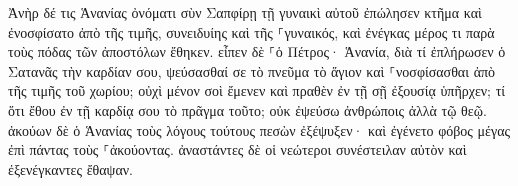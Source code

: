 \documentclass{openreader}
\begin{document}
Ἀνὴρ δέ τις Ἁνανίας ὀνόματι σὺν Σαπφίρῃ τῇ γυναικὶ αὐτοῦ ἐπώλησεν κτῆμα 
καὶ ἐνοσφίσατο ἀπὸ τῆς τιμῆς, συνειδυίης καὶ τῆς ⸀γυναικός, καὶ ἐνέγκας μέρος τι παρὰ τοὺς πόδας τῶν ἀποστόλων ἔθηκεν. 
εἶπεν δὲ ⸀ὁ Πέτρος· Ἁνανία, διὰ τί ἐπλήρωσεν ὁ Σατανᾶς τὴν καρδίαν σου, ψεύσασθαί σε τὸ πνεῦμα τὸ ἅγιον καὶ ⸀νοσφίσασθαι ἀπὸ τῆς τιμῆς τοῦ χωρίου; 
οὐχὶ μένον σοὶ ἔμενεν καὶ πραθὲν ἐν τῇ σῇ ἐξουσίᾳ ὑπῆρχεν; τί ὅτι ἔθου ἐν τῇ καρδίᾳ σου τὸ πρᾶγμα τοῦτο; οὐκ ἐψεύσω ἀνθρώποις ἀλλὰ τῷ θεῷ. 
ἀκούων δὲ ὁ Ἁνανίας τοὺς λόγους τούτους πεσὼν ἐξέψυξεν· καὶ ἐγένετο φόβος μέγας ἐπὶ πάντας τοὺς ⸀ἀκούοντας. 
ἀναστάντες δὲ οἱ νεώτεροι συνέστειλαν αὐτὸν καὶ ἐξενέγκαντες ἔθαψαν. 
\end{document}
